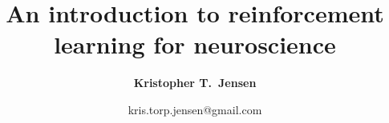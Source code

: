 
\usepackage{graphicx} %
\usepackage[compress]{natbib}
\usepackage[resetlabels]{multibib}

\usepackage{url}            %
\usepackage{float}
\usepackage[table]{xcolor}

\usepackage{caption}
\usepackage{subcaption}
\usepackage{amsmath,amssymb,bm}
\usepackage{multicol}
\usepackage{lineno}
\usepackage{authblk}

\usepackage[colorlinks=true, linkcolor=dblue, citecolor=dred, urlcolor=dblue]{hyperref}       %

\usepackage[nameinlink]{cleveref}
\usepackage[margin=1in]{geometry}
\renewcommand\b\bm
\setlength{\parindent}{0pt}
\setlength{\parskip  }{5.5pt}
\setlength\columnsep{30pt}
\setlength\footnotesep{15pt}

\title{An introduction to reinforcement learning for neuroscience \vspace{0.5em}}

\author[1,2]{\normalsize \bfseries Kristopher T.\ Jensen}
\date{\vspace*{-1.5em}
\normalsize kris.torp.jensen@gmail.com
}
